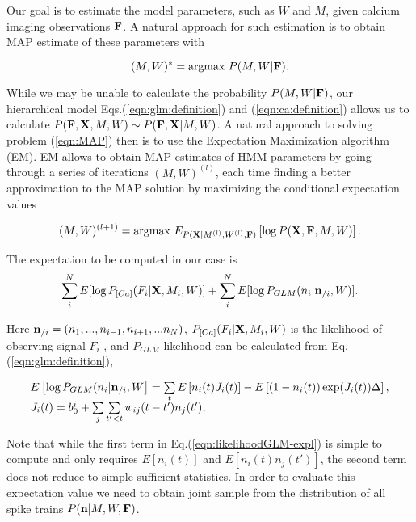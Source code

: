 Our goal is to estimate the model parameters, such as $W$ and $M$, given calcium imaging observations ${\bf F}$. A natural approach for such estimation is to obtain MAP estimate of these parameters with

\begin{equation}\label{eqn:MAP}
(M, W)^*=\text{argmax } P(M, W|{\bf F}).
\end{equation}

While we may be unable to calculate the probability $P(M, W|{\bf F})$, our hierarchical model Eqs.(\ref{eqn:glm:definition}) and (\ref{eqn:ca:definition}) allows us to calculate $P({\bf F}, {\bf X}, M, W)\sim P({\bf F}, {\bf X}|M, W)$. A natural approach to solving problem (\ref{eqn:MAP}) then is to use the Expectation Maximization algorithm (EM).  EM allows to obtain MAP estimates of HMM parameters by going through a series of iterations $(M, W)^{(l)}$, each time finding a better approximation to the MAP solution by maximizing the conditional expectation values

\begin{equation}
(M, W)^{(l+1)}=\text{argmax }E_{P({\bf X}|M^{(l)}, W^{(l)}, {\bf F})}\left[\log P({\bf X}, {\bf F}, M, W)\right].
\end{equation}

The expectation to be computed in our case is
\begin{equation}\label{eqn:loglik:definition-expl}
\sum_i^N E[\log P_{[Ca]}(F_i|{\bf X}, M_i, W)] + \sum_i^N E[\log P_{GLM}(n_i|{\bf n}_{/i}, W)].
\end{equation}

Here ${\bf n}_{/i}=(n_1, ..., n_{i-1}, n_{i+1}, ...n_N)$, $P_{[Ca]}(F_i|{\bf X}, M_i, W)$ is the likelihood of observing signal $F_i$ \cite{Vogelstein2009}, and $P_{GLM}$ likelihood can be calculated from Eq.(\ref{eqn:glm:definition}), 

\begin{equation}\label{eqn:likelihoodGLM-expl}
\begin{array}{l}
E\left[\log P_{GLM}(n_i|{\bf n}_{/i}, W\right]=\sum\limits_t E \left[ n_i(t) J_i(t)\right] - E\left[(1-n_i(t)) \exp(J_i(t)) \Delta \right], \\
J_i(t)=b_0^i+\sum\limits_{j} \sum\limits_{t'<t} w_{ij}(t-t')n_{j}(t'), 
\end{array}
\end{equation}

Note that while the first term in Eq.(\ref{eqn:likelihoodGLM-expl}) is simple to compute and only requires $E[n_i(t)]$ and $E[n_i(t) n_{j}(t')]$, the second term does not reduce to simple sufficient statistics. In order to evaluate this expectation value we need to obtain joint sample from the distribution of all spike trains $P({\bf n}|M, W, {\bf F})$.

